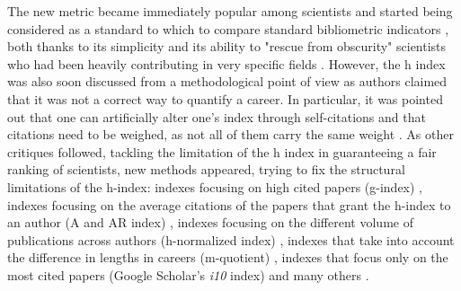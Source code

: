 The new metric became immediately popular among scientists and started being considered as a standard to which to compare standard bibliometric indicators  \cite{vanRaan2006}, both
thanks to its simplicity and its ability to "rescue from obscurity" scientists who had been heavily contributing in very specific fields \cite{Ball2005}. However,
the h index was also soon discussed from a methodological point of view as authors claimed that it was not a correct way to quantify a career. In particular, it was pointed
out that one can artificially alter one's index through self-citations \cite{PURVIS2006} and that
citations need to be weighed, as not all of them carry the same weight \cite{Wendl2007}. As other critiques followed, tackling the limitation of the h index in guaranteeing a fair
ranking of scientists, new methods appeared, trying to fix the structural limitations of the h-index: indexes focusing on high cited papers (g-index) \cite{Egghe2006}, indexes focusing
on the average citations of the papers that grant the h-index to an author (A and AR index) \cite{Jin2007}, indexes focusing on the different
volume of publications across authors (h-normalized index) \cite{Sidiropoulos2007}, indexes that take into account the difference in lengths in careers (m-quotient) \cite{Burrell2007},
indexes that focus only on the most cited papers (Google Scholar's \textit{i10} index) \cite{i10} and many others \cite{Alonso2009}.

